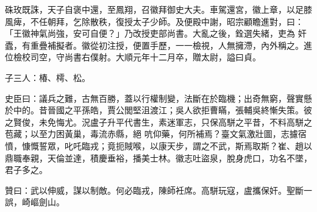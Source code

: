 \begin{pinyinscope}
 硃玫既誅，天子自褒中還，至鳳翔，召徽拜御史大夫。車駕還宮，徽上章，以足膝風痺，不任朝拜，乞除散秩，復授太子少師。及便殿中謝，昭宗顧瞻進對，曰：「王徽神氣尚強，安可自便？」乃改授吏部尚書。大亂之後，銓選失緒，吏為
 奸蠹，有重疊補擬者。徽從初注授，便置手歷，一一檢視，人無擁滯，內外稱之。進位檢校司空，守尚書右僕射。大順元年十二月卒，贈太尉，謚曰貞。



 子三人：椿、樗、松。



 史臣曰：議兵之難，古無百勝，蓋以行權制變，法斷在於臨機；出奇無窮，聲實懸於中的。昔晉國之平孫皓，賈公閭堅沮渡江；吳人欲拒曹瞞，張輔吳終慚失策。彼之賢俊，未免悔尤。況盧子升平代書生，素迷軍志，只保高駢之平昔，不料高駢之苞藏；以至力困黃巢，毒流赤縣，絕
 吭仰藥，何所補焉？臺文氣激壯圖，志攄宿憤，慷慨誓眾，叱吒臨戎；竟扼賊喉，以康天步，謂之不武，斯焉取斯？崔、趙以鼎職奉親，天倫並達，積慶垂裕，播美士林。徽志吐盜泉，脫身虎口，功名不墜，君子多之。



 贊曰：武以伸威，謀以制敵。何必臨戎，陳師衽席。高駢玩寇，盧攜保奸。聖斷一誤，崎嶇劍山。



\end{pinyinscope}